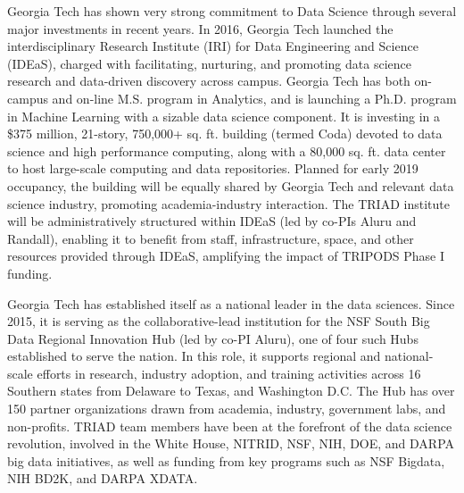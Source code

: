 \documentclass[12pt]{article}
\begin{document}
Georgia Tech has shown very strong commitment to Data Science through several major investments in recent years. In 2016, Georgia Tech launched the interdisciplinary Research Institute (IRI) for Data Engineering and Science (IDEaS), charged with facilitating, nurturing, and promoting data science research and data-driven discovery across campus. Georgia Tech has both on-campus and
on-line M.S. program in Analytics, and is launching a Ph.D. program in Machine Learning with
a sizable data science component. It is investing in a \$375 million, 21-story, 750,000+ sq. ft.
building (termed Coda) devoted to data science and high performance computing, along
with a 80,000 sq. ft. data center to host large-scale computing and data repositories.
Planned for early 2019 occupancy, the building will be equally shared by Georgia Tech
and relevant data science industry, promoting academia-industry interaction. The TRIAD
institute will be administratively structured within IDEaS (led by co-PIs Aluru and Randall),
enabling it to benefit from staff, infrastructure, space, and other resources provided
through IDEaS, amplifying the impact of TRIPODS Phase I funding.

Georgia Tech has established itself as a national leader in the data sciences. Since 2015, it is serving as the collaborative-lead institution for the NSF South Big Data Regional Innovation Hub (led by co-PI Aluru),  one of four such Hubs established to serve the nation.
In this role, it supports regional and
national-scale efforts in research, industry adoption, and training activities across 16 Southern
states from Delaware to Texas, and Washington D.C. The Hub has over 150 partner organizations drawn from academia, industry, government labs, and non-profits. TRIAD team members have been at the
forefront of the data science revolution, involved in the
White House, NITRID, NSF, NIH, DOE, and DARPA big data initiatives, as well as funding from key programs such as NSF Bigdata, NIH BD2K, and DARPA XDATA.


\end{document}
